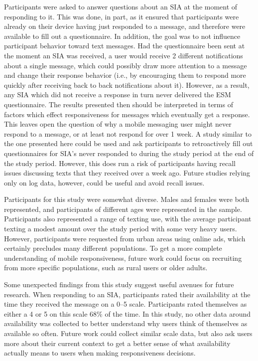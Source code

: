 \documentclass[12pt]{nuthesis}	%
\begin{document}
Participants were asked to answer questions about an SIA at the moment of responding to it. This was done, in part, as it ensured that participants were already on their device having just responded to a message, and therefore were available to fill out a questionnaire. In addition, the goal was to not influence participant behavior toward text messages. Had the questionnaire been sent at the moment an SIA was received, a user would receive 2 different notifications about a single message, which could possibly draw more attention to a message and change their response behavior (i.e., by encouraging them to respond more quickly after receiving back to back notifications about it). However, as a result, any SIA which did not receive a response in turn never delivered the ESM questionnaire. The results presented then should be interpreted in terms of factors which effect responsiveness for messages which eventually get a response. This leaves open the question of why a mobile messaging user might never respond to a message, or at least not respond for over 1 week. A study similar to the one presented here could be used and ask participants to retroactively fill out questionnaires for SIA's never responded to during the study period at the end of the study period. However, this does run a risk of participants having recall issues discussing texts that they received over a week ago. Future studies relying only on log data, however, could be useful and avoid recall issues.

Participants for this study were somewhat diverse. Males and females were both represented, and participants of different ages were represented in the sample. Participants also represented a range of texting use, with the average participant texting a modest amount over the study period with some very heavy users. However, participants were requested from urban areas using online ads, which certainly precludes many different populations. To get a more complete understanding of mobile responsiveness, future work could focus on recruiting from more specific populations, such as rural users or older adults.

Some unexpected findings from this study suggest useful avenues for future research. When responding to an SIA, participants rated their availability at the time they received the message on a 0--5 scale. Participants rated themselves as either a 4 or 5 on this scale 68\% of the time. In this study, no other data around availability was collected to better understand why users think of themselves as available so often. Future work could collect similar scale data, but also ask users more about their current context to get a better sense of what availability actually means to users when making responsiveness decisions.
\end{document}
